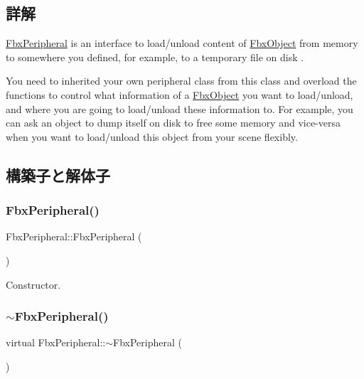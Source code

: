 \subsection{詳解}
\hyperlink{class_fbx_peripheral}{Fbx\+Peripheral} is an interface to load/unload content of \hyperlink{class_fbx_object}{Fbx\+Object} from memory to somewhere you defined, for example, to a temporary file on disk .

You need to inherited your own peripheral class from this class and overload the functions to control what information of a \hyperlink{class_fbx_object}{Fbx\+Object} you want to load/unload, and where you are going to load/unload these information to. For example, you can ask an object to dump itself on disk to free some memory and vice-\/versa when you want to load/unload this object from your scene flexibly. 

\subsection{構築子と解体子}
\mbox{\label{class_fbx_peripheral_a46a788c258ad53fed8a716abc03d36c3}} 
\subsubsection{\texorpdfstring{Fbx\+Peripheral()}{FbxPeripheral()}}
{\footnotesize\ttfamily Fbx\+Peripheral\+::\+Fbx\+Peripheral (\begin{DoxyParamCaption}{ }\end{DoxyParamCaption})}



Constructor. 

\mbox{\label{class_fbx_peripheral_aad41e072490022edaba6f3b7e11e0b5d}} 
\subsubsection{\texorpdfstring{$\sim$\+Fbx\+Peripheral()}{~FbxPeripheral()}}
{\footnotesize\ttfamily virtual Fbx\+Peripheral\+::$\sim$\+Fbx\+Peripheral (\begin{DoxyParamCaption}{ }\end{DoxyParamCaption})\hspace{0.3cm}{\ttfamily [virtual]}}



